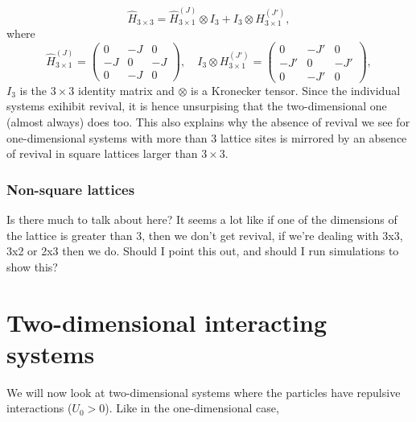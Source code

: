 \documentclass[a4paper, 10pt]{article}
\theoremstyle{plain}
\begin{document}
\begin{equation}
 \hat{H}_{3\times3}=\hat{H}_{3\times1}^{(J)}\otimes {I}_3
 +
 {I}_3\otimes H_{3\times1}^{(J')},
\end{equation}
where 
\begin{equation}
    \hat{H}_{3\times1}^{(J)}
    =
    \begin{pmatrix}
         0 & -J &  0 \\
        -J &  0 & -J \\
         0 & -J &  0
    \end{pmatrix},
    \quad
    {I}_3\otimes H_{3\times1}^{(J')}
    =
    \begin{pmatrix}
         0 & -J' &  0 \\
        -J' &  0 & -J' \\
         0 & -J' &  0
    \end{pmatrix},
\end{equation}
$I_3$ is the $3\times3$ identity matrix and $\otimes$ is a Kronecker tensor.
Since the individual systems exihibit revival, it is hence unsurpising that 
the two-dimensional one (almost always) does too. This also explains why the 
absence of revival we see for one-dimensional systems with more than $3$ 
lattice sites is mirrored by an absence of revival in square lattices larger
than $3\times3$.
\subsubsection{Non-square lattices}
Is there much to talk about here? It seems a lot like if one of the dimensions
of the lattice is greater than 3, then we don't get revival, if we're dealing 
with 3x3, 3x2 or 2x3 then we do. Should I point this out, and should I run 
simulations to show this?


\section{Two-dimensional interacting systems}
We will now look at two-dimensional systems where the particles have repulsive
interactions ($U_0 >0$). Like in the one-dimensional case, 
\newpage




\end{document}
